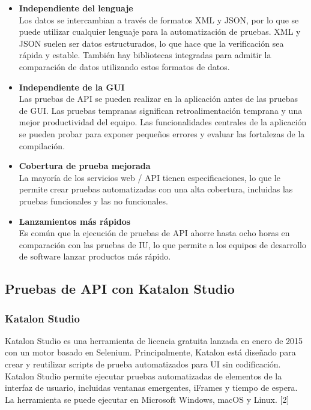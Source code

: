 \documentclass[twoside,twocolumn]{article}
\begin{document}
\begin{itemize}
  \item \textbf{Independiente del lenguaje} \\
  Los datos se intercambian a través de formatos XML y JSON, por lo que se puede utilizar cualquier lenguaje para la automatización de pruebas. XML y JSON suelen ser datos estructurados, lo que hace que la verificación sea rápida y estable. También hay bibliotecas integradas para admitir la comparación de datos utilizando estos formatos de datos.
  \item \textbf{Independiente de la GUI} \\
  Las pruebas de API se pueden realizar en la aplicación antes de las pruebas de GUI. Las pruebas tempranas significan retroalimentación temprana y una mejor productividad del equipo. Las funcionalidades centrales de la aplicación se pueden probar para exponer pequeños errores y evaluar las fortalezas de la compilación.
  \item \textbf{Cobertura de prueba mejorada} \\
  La mayoría de los servicios web / API tienen especificaciones, lo que le permite crear pruebas automatizadas con una alta cobertura, incluidas las pruebas funcionales y las no funcionales.
  \item \textbf{Lanzamientos más rápidos} \\
  Es común que la ejecución de pruebas de API ahorre hasta ocho horas en comparación con las pruebas de IU, lo que permite a los equipos de desarrollo de software lanzar productos más rápido.
\end{itemize}

\subsection{Pruebas de API con Katalon Studio}

\subsubsection{Katalon Studio}

Katalon Studio es una herramienta de licencia gratuita lanzada en enero de 2015 con un motor basado en Selenium. Principalmente, Katalon está diseñado para crear y reutilizar scripts de prueba automatizados para UI sin codificación. Katalon Studio permite ejecutar pruebas automatizadas de elementos de la interfaz de usuario, incluidas ventanas emergentes, iFrames y tiempo de espera. La herramienta se puede ejecutar en Microsoft Windows, macOS y Linux. [2]
\end{document}
